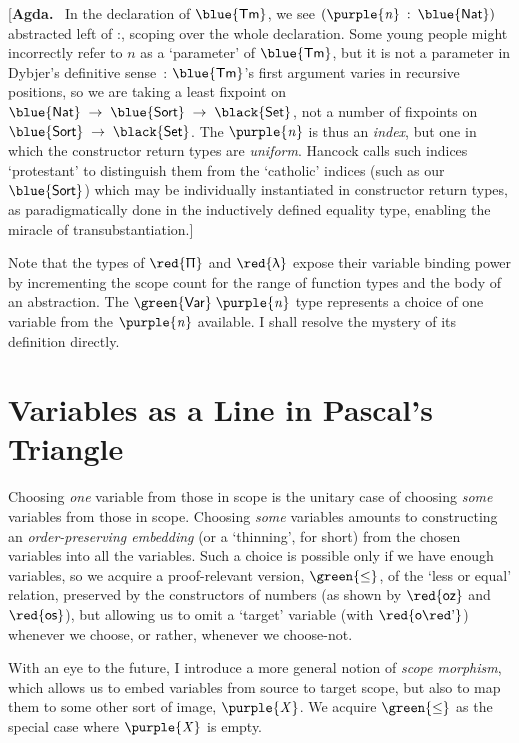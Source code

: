 \documentclass[natbib]{article}
\newcommand{\U}[1]{\black{\mathsf{#1}}}
\newcommand{\D}[1]{\blue{\mathsf{#1}}}
\newcommand{\C}[1]{\red{\mathsf{#1}}}
\newcommand{\F}[1]{\green{\mathsf{#1}}}
\newcommand{\V}[1]{\purple{\mathit{#1}}}
\newcommand{\agdanote}[1]{[\textbf{Agda.}~ #1]}
\begin{document}
\agdanote{In the declaration of \ensuremath{\D{Tm}}, we see \ensuremath{(\V{n}\;\mathbin{:}\;\D{Nat})} abstracted left of \ensuremath{\mathbin{:}},
scoping over the whole declaration. Some young people might incorrectly refer to
$n$ as a `parameter' of \ensuremath{\D{Tm}}, but it is not a parameter in Dybjer's definitive
sense~\cite{dybjer:families}: \ensuremath{\D{Tm}}'s first argument varies in
recursive positions, so we are taking a least fixpoint on \ensuremath{\D{Nat}\;\to \;\D{Sort}\;\to \;\U{Set}},
not a number of fixpoints on \ensuremath{\D{Sort}\;\to \;\U{Set}}. The \ensuremath{\V{n}} is thus an \emph{index},
but one in which the constructor return types are \emph{uniform}. Hancock calls
such indices `protestant' to distinguish them from the `catholic' indices (such
as our \ensuremath{\D{Sort}}) which may be individually instantiated in constructor return
types, as paradigmatically done in the inductively defined equality type,
enabling
the miracle of transubstantiation.}

Note that the types of \ensuremath{\C{\Uppi}} and \ensuremath{\C{\uplambda}} expose their variable binding power by
incrementing the scope count for the range of function types and the body of
an abstraction. The \ensuremath{\F{Var}\;\V{n}} type represents a choice of one variable from the
\ensuremath{\V{n}} available. I shall resolve the mystery of its definition directly.


\section{Variables as a Line in Pascal's Triangle}

Choosing \emph{one} variable from those in scope is the unitary case
of choosing \emph{some} variables from those in scope.  Choosing
\emph{some} variables amounts to constructing an
\emph{order-preserving embedding} (or a `thinning', for short) from
the chosen variables into all the variables.  Such a choice is
possible only if we have enough variables, so we acquire a
proof-relevant version, \ensuremath{\F{\le}}, of the `less or equal' relation,
preserved by the constructors of numbers (as shown by \ensuremath{\C{oz}} and \ensuremath{\C{os}}),
but allowing us to omit a `target' variable (with \ensuremath{\C{o\apo}}) whenever we
choose, or rather, whenever we choose-not.

With an eye to the future, I introduce a more general notion of
\emph{scope morphism}, which allows us to embed variables from source
to target scope, but also to map them to some other sort of image, \ensuremath{\V{X}}.
We acquire \ensuremath{\F{\le}} as the special case where \ensuremath{\V{X}} is empty.
\end{document}
